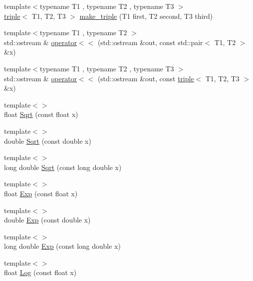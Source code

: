 \begin{DoxyCompactItemize}
\item 
{\footnotesize template$<$typename T1 , typename T2 , typename T3 $>$ }\\\hyperlink{structtriple}{triple}$<$ T1, T2, T3 $>$ \hyperlink{centroidalifold_2contrafold_2_utilities_8ipp_a765162c27da3c4c997099267c3d3fe07}{make\+\_\+triple} (T1 first, T2 second, T3 third)
\item 
{\footnotesize template$<$typename T1 , typename T2 $>$ }\\std\+::ostream \& \hyperlink{centroidalifold_2contrafold_2_utilities_8ipp_a90330689e9660b8e3f4720211e99792a}{operator$<$$<$} (std\+::ostream \&out, const std\+::pair$<$ T1, T2 $>$ \&x)
\item 
{\footnotesize template$<$typename T1 , typename T2 , typename T3 $>$ }\\std\+::ostream \& \hyperlink{centroidalifold_2contrafold_2_utilities_8ipp_a3d51e9fcc4b545214345eef0c3ecf3e8}{operator$<$$<$} (std\+::ostream \&out, const \hyperlink{structtriple}{triple}$<$ T1, T2, T3 $>$ \&x)
\item 
{\footnotesize template$<$$>$ }\\float \hyperlink{centroidalifold_2contrafold_2_utilities_8ipp_a8b3962d75e7f29b34971181b12f527da}{Sqrt} (const float x)
\item 
{\footnotesize template$<$$>$ }\\double \hyperlink{centroidalifold_2contrafold_2_utilities_8ipp_ae9fab1428944ba857cc4ceb4897c93a0}{Sqrt} (const double x)
\item 
{\footnotesize template$<$$>$ }\\long double \hyperlink{centroidalifold_2contrafold_2_utilities_8ipp_a819ff1297b5800fc0810ce49766400d9}{Sqrt} (const long double x)
\item 
{\footnotesize template$<$$>$ }\\float \hyperlink{centroidalifold_2contrafold_2_utilities_8ipp_a29d0fd4bdf4dc3019da5511afc7e3f92}{Exp} (const float x)
\item 
{\footnotesize template$<$$>$ }\\double \hyperlink{centroidalifold_2contrafold_2_utilities_8ipp_ad78e475abfaf2452e00e9f05199034f3}{Exp} (const double x)
\item 
{\footnotesize template$<$$>$ }\\long double \hyperlink{centroidalifold_2contrafold_2_utilities_8ipp_a41272df091ca16294c88ca5e8e4c6dfe}{Exp} (const long double x)
\item 
{\footnotesize template$<$$>$ }\\float \hyperlink{centroidalifold_2contrafold_2_utilities_8ipp_ad267663990a55841bfeaa3c5a05f8512}{Log} (const float x)

\end{DoxyCompactItemize}
